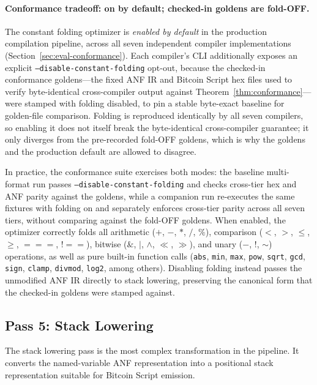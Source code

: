 \documentclass[11pt,a4paper]{article}
\begin{document}
\paragraph{Conformance tradeoff: on by default; checked-in goldens are fold-OFF.}
The constant folding optimizer is \emph{enabled by default} in the
production compilation pipeline, across all seven independent compiler
implementations (Section~\ref{sec:eval-conformance}). Each compiler's CLI
additionally exposes an explicit \texttt{--disable-constant-folding}
opt-out, because the checked-in conformance goldens---the fixed ANF IR and
Bitcoin Script hex files used to verify byte-identical cross-compiler
output against Theorem~\ref{thm:conformance}---were stamped with folding
disabled, to pin a stable byte-exact baseline for golden-file comparison.
Folding is reproduced identically by all seven compilers, so enabling it
does not itself break the byte-identical cross-compiler guarantee; it only
diverges from the pre-recorded fold-OFF goldens, which is why the goldens
and the production default are allowed to disagree.

In practice, the conformance suite exercises both modes: the baseline
multi-format run passes \texttt{--disable-constant-folding} and checks
cross-tier hex and ANF parity against the goldens, while a companion run
re-executes the same fixtures with folding on and separately enforces
cross-tier parity across all seven tiers, without comparing against the
fold-OFF goldens. When enabled, the optimizer correctly folds all
arithmetic ($+$, $-$, $*$, $/$, $\%$), comparison ($<$, $>$, $\leq$,
$\geq$, $===$, $!==$), bitwise ($\&$, $|$, $\wedge$, $\ll$, $\gg$), and
unary ($-$, $!$, $\sim$) operations, as well as pure built-in function
calls (\texttt{abs}, \texttt{min}, \texttt{max}, \texttt{pow},
\texttt{sqrt}, \texttt{gcd}, \texttt{sign}, \texttt{clamp},
\texttt{divmod}, \texttt{log2}, among others). Disabling folding instead
passes the unmodified ANF IR directly to stack lowering, preserving the
canonical form that the checked-in goldens were stamped against.

\subsection{Pass 5: Stack Lowering}
\label{sec:pass-stack}

The stack lowering pass is the most complex transformation in the pipeline.
It converts the named-variable ANF representation into a positional stack
representation suitable for Bitcoin Script emission.
\end{document}
